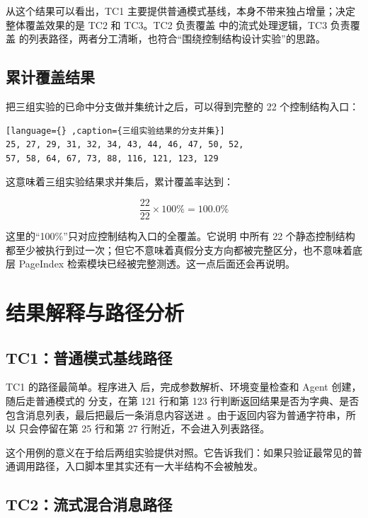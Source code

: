 从这个结果可以看出，TC1 主要提供普通模式基线，本身不带来独占增量；决定整体覆盖效果的是 TC2 和 TC3。TC2 负责覆盖  中的流式处理逻辑，TC3 负责覆盖  的列表路径，两者分工清晰，也符合“围绕控制结构设计实验”的思路。

\subsection{累计覆盖结果}

把三组实验的已命中分支做并集统计之后，可以得到完整的 22 个控制结构入口：

\begin{lstlisting}[language={} ,caption={三组实验结果的分支并集}]
25, 27, 29, 31, 32, 34, 43, 44, 46, 47, 50, 52,
57, 58, 64, 67, 73, 88, 116, 121, 123, 129
\end{lstlisting}

这意味着三组实验结果求并集后，累计覆盖率达到：

\[
\frac{22}{22} \times 100\% = 100.0\%
\]

这里的“100\%”只对应控制结构入口的全覆盖。它说明  中所有 22 个静态控制结构都至少被执行到过一次；但它不意味着真假分支方向都被完整区分，也不意味着底层 PageIndex 检索模块已经被完整测透。这一点后面还会再说明。

\section{结果解释与路径分析}

\subsection{TC1：普通模式基线路径}

TC1 的路径最简单。程序进入  后，完成参数解析、环境变量检查和 Agent 创建，随后走普通模式的  分支，在第 121 行和第 123 行判断返回结果是否为字典、是否包含消息列表，最后把最后一条消息内容送进 。由于返回内容为普通字符串，所以  只会停留在第 25 行和第 27 行附近，不会进入列表路径。

这个用例的意义在于给后两组实验提供对照。它告诉我们：如果只验证最常见的普通调用路径，入口脚本里其实还有一大半结构不会被触发。

\subsection{TC2：流式混合消息路径}

